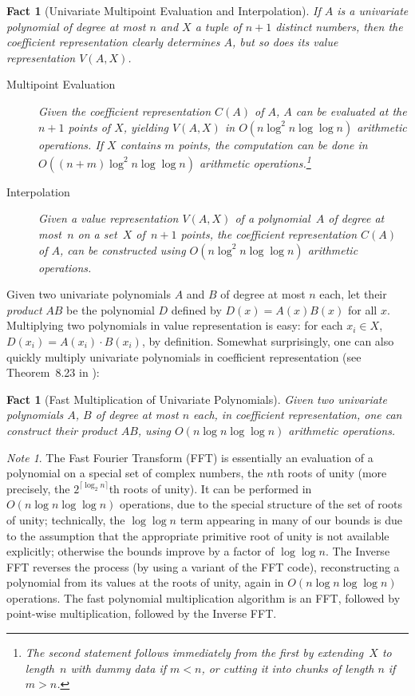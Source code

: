 \documentclass[11pt]{article}
\newtheorem{fact}[theorem]{Fact}
\theoremstyle{remark}
\newtheorem*{note}{Note}
\begin{document}
\begin{fact}[Univariate Multipoint Evaluation and Interpolation]
  \label{fact:eval-inter}
  If $A$ is a univariate polynomial of degree at most $n$ and $X$ a tuple of $n+1$ distinct numbers,  then the coefficient representation clearly determines $A$, but so does its value representation $V(A,X)$.
  \begin{description}
  \item[Multipoint Evaluation] Given the coefficient representation
    $C(A)$ of $A$, $A$ can be evaluated at the $n+1$ points of $X$,
    yielding $V(A,X)$ in $O(n \log^2 n \log \log n)$ arithmetic
    operations.
If $X$ contains $m$ points, the computation can be done in $O((n+m) \log^2 n \log \log n)$ arithmetic operations.\footnote{The second statement follows immediately from the first by
      extending~$X$ to length~$n$ with dummy data if $m<n$, or cutting
      it into chunks of length $n$ if $m>n$.}
  \item[Interpolation] Given a value representation $V(A,X)$ of a
    polynomial~$A$ of degree at most~$n$ on a set~$X$ of~$n+1$ points,
    the coefficient representation $C(A)$ of $A$, can be constructed
    using $O(n \log^2 n \log \log n)$ arithmetic operations.
\end{description}
\end{fact}

Given two univariate polynomials $A$ and $B$ of degree at most $n$
each, let their \emph{product} $AB$ be the polynomial $D$ defined by $D(x)=A(x)B(x)$ for all $x$.  Multiplying two polynomials in
value representation is easy: for each $x_i \in X$, $D(x_i)=A(x_i)\cdot B(x_i)$,
by definition.  Somewhat surprisingly, one can also quickly multiply univariate polynomials in coefficient representation (see Theorem~8.23 in \cite{gg-mca-99}):

\begin{fact}[Fast Multiplication of Univariate Polynomials]
  \label{fact:fast-multiply}
  Given two univariate polynomials $A$, $B$ of degree at most $n$
  each, in coefficient representation, one can construct their product
  $AB$, using $O(n \log n \log \log n)$ arithmetic operations.
\end{fact}

\begin{note}
  The Fast Fourier Transform (FFT) is essentially an evaluation of a
  polynomial on a special set of complex numbers, the $n$th roots of
  unity (more precisely, the $2^{\lceil \log_2 n \rceil}$th roots of
  unity).  It can be performed in $O(n \log n \log \log n)$
  operations, due to the special structure of the set of roots of
  unity; technically, the $\log \log n$ term appearing in many of our
  bounds is due to the assumption that the appropriate primitive root
  of unity is not available explicitly; otherwise the bounds improve
  by a factor of $\log \log n$.  The Inverse FFT reverses the process
  (by using a variant of the FFT code), reconstructing a polynomial
  from its values at the roots of unity, again in $O(n \log n \log
  \log n)$ operations. The fast polynomial multiplication algorithm is an FFT,
  followed by point-wise multiplication, followed by the Inverse FFT.
\end{note}
\end{document}
